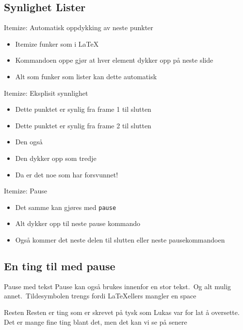 \subsection*{Synlighet Lister}
\begin{frame}{Itemize: Automatisk oppdykking av neste punkter}
\begin{itemize}[<+->]
    \item Itemize funker som i LaTeX
    \item Kommandoen oppe gjør at hver element dykker opp på neste slide
    \item Alt som funker som lister kan dette automatisk
\end{itemize}

\end{frame}

\begin{frame}{Itemize: Eksplisit synnlighet}
\begin{itemize}
    \item<1-> Dette punktet er synlig fra frame 1 til slutten
    \item<2-> Dette punktet er synlig fra frame 2 til slutten
    \item<2-3> Den også
    \item<3-> Den dykker opp som tredje
    \item<4-> Da er det noe som har forsvunnet!
\end{itemize}

\end{frame}
\begin{frame}{Itemize: Pause}
\begin{itemize}
    \item Det samme kan gjøres med \texttt{pause}
    \item Alt dykker opp til neste pause kommando
    \pause
    \item Også kommer det neste delen til slutten eller neste pausekommandoen
\end{itemize}

\end{frame}

\subsection*{En ting til med pause}
\begin{frame}{Pause med tekst}
Pause kan også brukes innenfor en stor tekst.\pause~Og alt mulig annet.\pause~Tildesymbolen trengs fordi \LaTeX ellers mangler en space
\end{frame}
%
\begin{frame}{Resten}
Resten er ting som er skrevet på tysk som Lukas var for lat å oversette. Det er mange fine ting blant det, men det kan vi se på senere
\end{frame}

